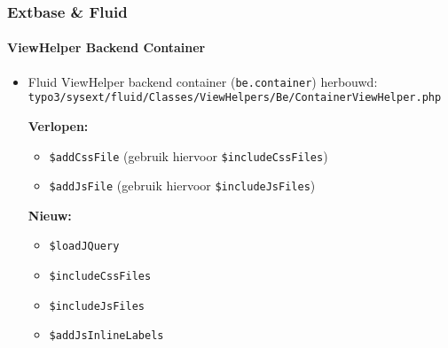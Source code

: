 
\begin{frame}[fragile]
	\frametitle{Extbase \& Fluid}
	\framesubtitle{ViewHelper Backend Container}

	\lstset{
		basicstyle=\smaller\ttfamily
	}

	\begin{itemize}
		\item Fluid ViewHelper backend container (\texttt{be.container}) herbouwd:\newline
			\smaller\texttt{typo3/sysext/fluid/Classes/ViewHelpers/Be/ContainerViewHelper.php}\normalsize\newline

			\smaller\textbf{Verlopen:}\normalsize
			\begin{itemize}
				\item \texttt{\$addCssFile} (gebruik hiervoor \texttt{\$includeCssFiles})
				\item \texttt{\$addJsFile} (gebruik hiervoor \texttt{\$includeJsFiles})
			\end{itemize}

			\smaller\textbf{Nieuw:}\normalsize
			\begin{itemize}
				\item \texttt{\$loadJQuery}
				\item \texttt{\$includeCssFiles}
				\item \texttt{\$includeJsFiles}
				\item \texttt{\$addJsInlineLabels}
			\end{itemize}

	\end{itemize}

\end{frame}



